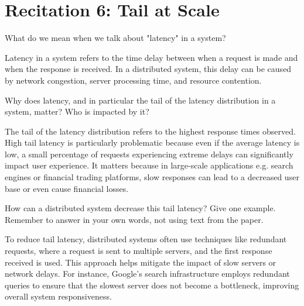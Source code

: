 \documentclass[a4paper]{article}
\begin{document}
\section*{Recitation 6: Tail at Scale}

\begin{Exercise}
    What do we mean when we talk about "latency" in a system?
\end{Exercise} 
\begin{Solution}
    Latency in a system refers to the time delay between when a request is made and when the response is received. In a distributed system, this delay can be caused by network congestion, server processing time, and resource contention.
\end{Solution}
\begin{Exercise}
    Why does latency, and in particular the tail of the latency distribution in a system, matter? Who is impacted by it?
\end{Exercise}
\begin{Solution}
    The tail of the latency distribution refers to the highest response times observed. High tail latency is particularly problematic because even if the average latency is low, a small percentage of requests experiencing extreme delays can significantly impact user experience. It matters because in large-scale applications e.g. search engines or financial trading platforms, slow responses can lead to a decreased user base or even cause financial losses. 
\end{Solution}
\begin{Exercise}
    How can a distributed system decrease this tail latency? Give one example. Remember to answer in your own words, not using text from the paper.
\end{Exercise}
\begin{Solution}
    To reduce tail latency, distributed systems often use techniques like redundant requests, where a request is sent to multiple servers, and the first response received is used. This approach helps mitigate the impact of slow servers or network delays. For instance, Google's search infrastructure employs redundant queries to ensure that the slowest server does not become a bottleneck, improving overall system responsiveness.
\end{Solution}
\end{document}
